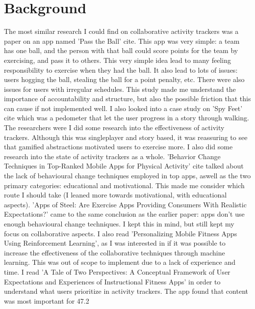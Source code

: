 \documentclass{l4proj}
\begin{document}
\chapter{Background}
The most similar research I could find on collaborative activity trackers was a paper on an app named 'Pass the Ball' cite{}. This app was very simple: a team has one ball, and the person with that ball could score points for the team by exercising, and pass it to others. This very simple idea lead to many feeling responsibility to exercise when they had the ball. It also lead to lots of issues: users hogging the ball, stealing the ball for a point penalty, etc. There were also issues for users with irregular schedules. This study made me understand the importance of accountability and structure, but also the possible friction that this can cause if not implemented well. I also looked into a case study on 'Spy Feet' cite{} which was a pedometer that let the user progress in a story through walking. The researchers were I did some research into the effectiveness of activity trackers. Although this was singleplayer and story based, it was reassuring to see that gamified abstractions motivated users to exercise more. I also did some research into the state of activity trackers as a whole. 'Behavior Change Techniques in Top-Ranked Mobile Apps for Physical Activity' cite{} talked about the lack of behavioural change techniques employed in top apps, aswell as the two primary categories: educational and motivational. This made me consider which route I should take (I leaned more towards motivational, with educational aspects). 'Apps of Steel: Are Exercise Apps Providing Consumers With Realistic Expectations?' came to the same conclusion as the earlier paper: apps don't use enough behavioural change techniques. I kept this in mind, but still kept my focus on collaborative aspects. I also read 'Personalizing Mobile Fitness Apps Using Reinforcement Learning', as I was interested in if it was possible to increase the effectiveness of the collaborative techniques through machine learning. This was out of scope to implement due to a lack of experience and time. I read 'A Tale of Two Perspectives: A Conceptual Framework of User Expectations and Experiences of Instructional Fitness Apps' in order to understand what users prioritize in activity trackers. The app found that content was most important for 47.2%
\end{document}
